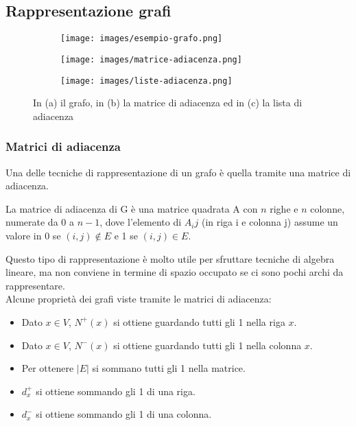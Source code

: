 \subsection{Rappresentazione grafi}
\begin{figure}[h!]
    \centering
    \begin{subfigure}{.3\textwidth}
        \centering
        \texttt{[image: images/esempio-grafo.png]}
        \caption{}
    \end{subfigure}
    \hfill
    \begin{subfigure}{.3\textwidth}
        \centering
        \texttt{[image: images/matrice-adiacenza.png]}
        \caption{}
    \end{subfigure}
    \hfill
    \begin{subfigure}{.3\textwidth}
        \centering
        \texttt{[image: images/liste-adiacenza.png]}
        \caption{}
    \end{subfigure}
    \vspace{-5pt}
    \caption{In (a) il grafo, in (b) la matrice di adiacenza ed in (c) la lista di adiacenza}
\end{figure}
\subsubsection{Matrici di adiacenza}
Una delle tecniche di rappresentazione di un grafo è quella tramite una matrice di adiacenza.
\begin{definition}
    La matrice di adiacenza di G è una matrice quadrata A con $n$ righe e $n$ colonne, numerate da 0 a $n-1$, dove l'elemento di $A_ij$ (in riga i e colonna j) assume un valore in 0 se $(i,j) \notin E$ e 1 se $(i,j) \in E$.
\end{definition}
Questo tipo di rappresentazione è molto utile per sfruttare tecniche di algebra lineare, ma non conviene in termine di spazio occupato se ci sono pochi archi da rappresentare.\\
Alcune proprietà dei grafi viste tramite le matrici di adiacenza:
\begin{itemize}
    \item Dato $x \in V$, $N^+(x)$ si ottiene guardando tutti gli 1 nella riga $x$.
    \item Dato $x \in V$, $N^-(x)$ si ottiene guardando tutti gli 1 nella colonna $x$.
    \item Per ottenere $|E|$ si sommano tutti gli 1 nella matrice.
    \item $d^+_x$ si ottiene sommando gli 1 di una riga.
    \item $d^-_x$ si ottiene sommando gli 1 di una colonna.
\end{itemize}

